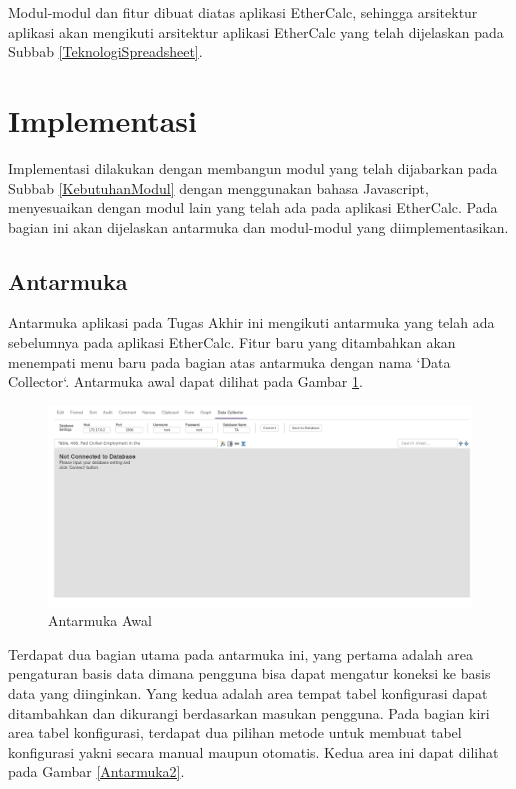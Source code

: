 	Modul-modul dan fitur dibuat diatas aplikasi EtherCalc, sehingga arsitektur aplikasi akan mengikuti arsitektur aplikasi EtherCalc yang telah dijelaskan pada Subbab \ref{TeknologiSpreadsheet}.

\section{Implementasi}
Implementasi dilakukan dengan membangun modul yang telah dijabarkan pada Subbab \ref{KebutuhanModul} dengan menggunakan bahasa Javascript, menyesuaikan dengan modul lain yang telah ada pada aplikasi EtherCalc. Pada bagian ini akan dijelaskan antarmuka dan modul-modul yang diimplementasikan.
	\subsection{Antarmuka}
	Antarmuka aplikasi pada Tugas Akhir ini mengikuti antarmuka yang telah ada sebelumnya pada aplikasi EtherCalc. Fitur baru yang ditambahkan akan menempati menu baru pada bagian atas antarmuka dengan nama `Data Collector`. Antarmuka awal dapat dilihat pada Gambar \ref{Antarmuka1}.

	\begin{figure}[htb]
	    \centering
	    \includegraphics[width=1.0\textwidth]{resources/chapter-4-interface-1.png}
	    \caption{Antarmuka Awal}
		\label{Antarmuka1}
	\end{figure}

	Terdapat dua bagian utama pada antarmuka ini, yang pertama adalah area pengaturan basis data dimana pengguna bisa dapat mengatur koneksi ke basis data yang diinginkan. Yang kedua adalah area tempat tabel konfigurasi dapat ditambahkan dan dikurangi berdasarkan masukan pengguna. Pada bagian kiri area tabel konfigurasi, terdapat dua pilihan metode untuk membuat tabel konfigurasi yakni secara manual maupun otomatis. Kedua area ini dapat dilihat pada Gambar \ref{Antarmuka2}.

